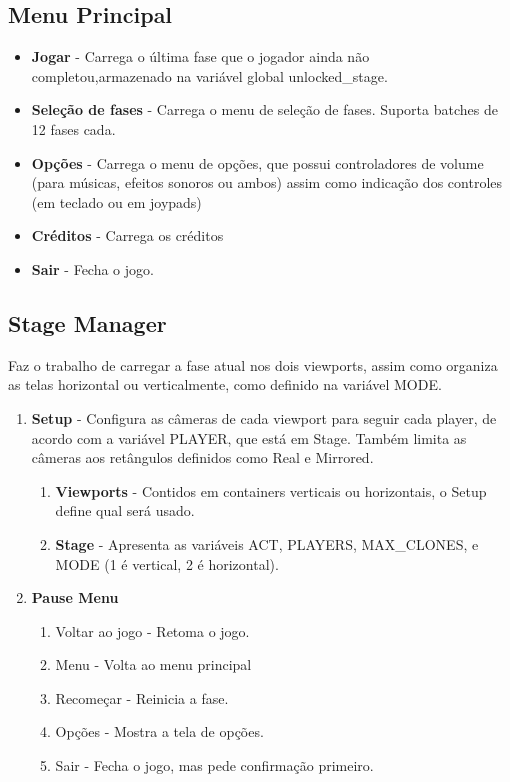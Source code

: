 \documentclass[a4paper, 11pt]{article}
\begin{document}
		\subsection{Menu Principal} 
			\begin{itemize} 
				\item \textbf{Jogar} - Carrega o última fase que o jogador ainda não completou,armazenado na variável global unlocked\_stage. 
				\item \textbf{Seleção de fases} - Carrega o menu de seleção de fases. Suporta batches de 12 fases cada.
				\item \textbf{Opções} - Carrega o menu de opções, que possui controladores de volume (para músicas, efeitos sonoros ou ambos) assim como indicação dos controles (em teclado ou em joypads)
				\item \textbf{Créditos} - Carrega os créditos 
				\item \textbf{Sair} - Fecha o jogo.
			\end{itemize} 
 
		\subsection{Stage Manager} 
			Faz o trabalho de carregar a fase atual nos dois viewports, assim como organiza as telas horizontal ou verticalmente, como definido na variável MODE.
			\begin{enumerate}
			\item \textbf{Setup} - Configura as câmeras de cada viewport para seguir cada player, de acordo com a variável PLAYER, que está em Stage. Também limita as câmeras aos retângulos definidos como Real e Mirrored.
				\begin{enumerate}
				\item \textbf{Viewports} - Contidos em containers verticais ou horizontais, o Setup define qual será usado.
				\item \textbf{Stage} - Apresenta as variáveis ACT, PLAYERS, MAX\_CLONES, e MODE (1 é vertical, 2 é horizontal).
				\end{enumerate}
			\item \textbf{Pause Menu}
				\begin{enumerate}
				\item Voltar ao jogo - Retoma o jogo.
				\item Menu - Volta ao menu principal
				\item Recomeçar - Reinicia a fase.
				\item Opções - Mostra a tela de opções.
				\item Sair - Fecha o jogo, mas pede confirmação primeiro.
				\end{enumerate}
			\end{enumerate}
\end{document}
